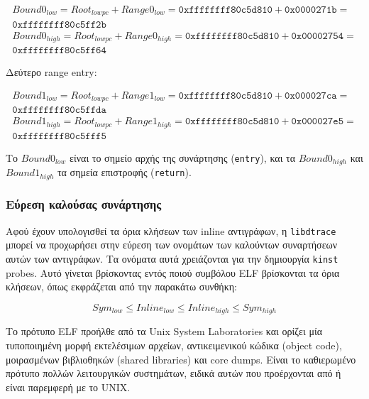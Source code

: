 \documentclass[12pt]{article}
\begin{document}
\begin{equation}
\begin{split}
	Bound0_{low} = Root_{lowpc} + Range0_{low} =
	\mathtt{0xffffffff80c5d810} + \mathtt{0x0000271b} = \\
	\mathtt{0xffffffff80c5ff2b} \\
	Bound0_{high} = Root_{lowpc} + Range0_{high} =
	\mathtt{0xffffffff80c5d810} + \mathtt{0x00002754} = \\
	\mathtt{0xffffffff80c5ff64}
\end{split}
\label{range1}
\end{equation}

Δεύτερο range entry:

\begin{equation}
\begin{split}
	Bound1_{low} = Root_{lowpc} + Range1_{low} =
	\mathtt{0xffffffff80c5d810} + \mathtt{0x000027ca} = \\
	\mathtt{0xffffffff80c5ffda} \\
	Bound1_{high} = Root_{lowpc} + Range1_{high} =
	\mathtt{0xffffffff80c5d810} + \mathtt{0x000027e5} = \\
	\mathtt{0xffffffff80c5fff5}
\end{split}
\label{range2}
\end{equation}

Το $Bound0_{low}$ είναι το σημείο αρχής της συνάρτησης (\lstinline{entry}), και
τα $Bound0_{high}$ και $Bound1_{high}$ τα σημεία επιστροφής
(\lstinline{return}).

\subsubsection{Εύρεση καλούσας συνάρτησης} \label{caller}

Αφού έχουν υπολογισθεί τα όρια κλήσεων των inline αντιγράφων, η
\lstinline{libdtrace} μπορεί να προχωρήσει στην εύρεση των ονομάτων των
καλούντων συναρτήσεων αυτών των αντιγράφων. Τα ονόματα αυτά χρειάζονται για την
δημιουργία \lstinline{kinst} probes. Αυτό γίνεται βρίσκοντας εντός ποιού
συμβόλου ELF βρίσκονται τα όρια κλήσεων, όπως εκφράζεται από την παρακάτω
συνθήκη:

\[
	Sym_{low} \leq Inline_{low} \leq Inline_{high} \leq Sym_{high}
\]

Το πρότυπο ELF \cite{elfspec} προήλθε από τα Unix System Laboratories και
ορίζει μία τυποποιημένη μορφή εκτελέσιμων αρχείων, αντικειμενικού κώδικα
(object code), μοιρασμένων βιβλιοθηκών (shared libraries) και core dumps. Είναι
το καθιερωμένο πρότυπο πολλών λειτουργικών συστημάτων, ειδικά αυτών που
προέρχονται από ή είναι παρεμφερή με το UNIX.
\end{document}
